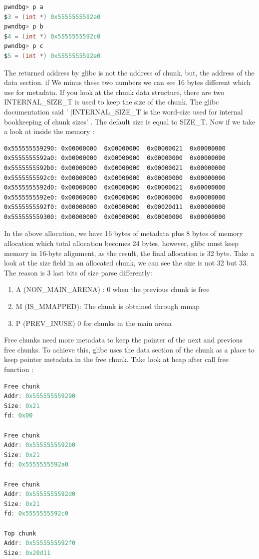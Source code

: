 \documentclass{masterthesis}
\newcommand*\sizet{SIZE\_T}
\newcommand*\libc{glibc}
\begin{document}
\begin{lstlisting}[language=c,frame=tlrb]
pwndbg> p a
$3 = (int *) 0x5555555592a0
pwndbg> p b
$4 = (int *) 0x5555555592c0
pwndbg> p c
$5 = (int *) 0x5555555592e0
\end{lstlisting}
The returned address by \libc{} is not the address of chunk, but, the address of the data section. if We minus these two numbers we can see 16 bytes different which use for metadata. If you look at the chunk data structure, there are two INTERNAL\_SIZE\_T is used to keep the size of the chunk. The \libc{} documentation said ' |INTERNAL\_SIZE\_T is the word-size used for internal bookkeeping of chunk sizes' . The default size is equal to \sizet{}. Now if we take a look at inside the memory : 
\begin{lstlisting}[frame=tlrb]
0x555555559290:	0x00000000	0x00000000	0x00000021	0x00000000
0x5555555592a0:	0x00000000	0x00000000	0x00000000	0x00000000
0x5555555592b0:	0x00000000	0x00000000	0x00000021	0x00000000
0x5555555592c0:	0x00000000	0x00000000	0x00000000	0x00000000
0x5555555592d0:	0x00000000	0x00000000	0x00000021	0x00000000
0x5555555592e0:	0x00000000	0x00000000	0x00000000	0x00000000
0x5555555592f0:	0x00000000	0x00000000	0x00020d11	0x00000000
0x555555559300:	0x00000000	0x00000000	0x00000000	0x00000000
\end{lstlisting}
In the above allocation, we have 16 bytes of metadata plus 8 bytes of memory allocation which total allocation becomes 24 bytes, however, \libc{} must keep memory in 16-byte alignment, as the result, the final allocation is 32 byte. Take a look at the size field in an allocated chunk, we can see the size is not 32 but 33. The reason is 3 last bits of size parse differently:
\begin{enumerate}
	\item A (NON\_MAIN\_ARENA) : 0 when the previous chunk is free
	\item M (IS\_MMAPPED): The chunk is obtained through mmap
	\item P (PREV\_INUSE) 0 for chunks in the main arena
\end{enumerate}
Free chunks need more metadata to keep the pointer of the next and previous free chunks. To achieve this, \libc{} uses the data section of the chunk as a place to keep pointer metadata in the free chunk. Take look at heap after call free function :
\begin{lstlisting}[language=c,frame=tlrb]
Free chunk 
Addr: 0x555555559290
Size: 0x21
fd: 0x00

Free chunk
Addr: 0x5555555592b0
Size: 0x21
fd: 0x5555555592a0

Free chunk 
Addr: 0x5555555592d0
Size: 0x21
fd: 0x5555555592c0

Top chunk
Addr: 0x5555555592f0
Size: 0x20d11
\end{lstlisting}
\end{document}

